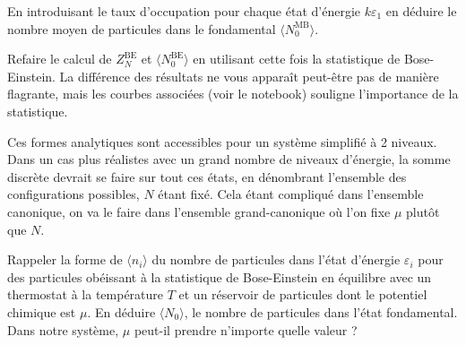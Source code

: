 \question
En introduisant le taux d'occupation pour chaque état d'énergie $k \varepsilon_1$ en déduire le nombre moyen de particules dans le fondamental $\langle N_0^{\mathrm{MB}} \rangle$.

\question
Refaire le calcul de $Z_N^{\mathrm{BE}}$ et $\langle N_0^{\mathrm{BE}} \rangle$ en utilisant cette fois la statistique de Bose-Einstein. La différence des résultats ne vous apparaît peut-être pas de manière flagrante, mais les courbes associées (voir le notebook) souligne l'importance de la statistique.

Ces formes analytiques sont accessibles pour un système simplifié à 2 niveaux. Dans un cas plus réalistes avec un grand nombre de niveaux d'énergie, la somme discrète devrait se faire sur tout ces états, en dénombrant l'ensemble des configurations possibles, $N$ étant fixé. Cela étant compliqué dans l'ensemble canonique, on va le faire dans l'ensemble grand-canonique où l'on fixe $\mu$ plutôt que $N$.


\bigskip
{}

\question
Rappeler la forme de $\langle n_i \rangle$ du nombre de particules dans l'état d'énergie $\varepsilon_i$ pour des particules obéissant à la statistique de Bose-Einstein en équilibre avec un thermostat à la température $T$ et un réservoir de particules dont le potentiel chimique est $\mu$. En déduire $\langle N_0 \rangle$, le nombre de particules dans l'état fondamental. Dans notre système, $\mu$ peut-il prendre n'importe quelle valeur ?

